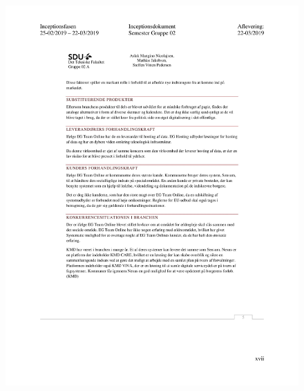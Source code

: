 \begin{figure}[hb]
  \includegraphics[scale = 0.33]{./PNG/Inceptions/Gruppe02+InceptionsDokument-50.jpg} 
\end{figure}

